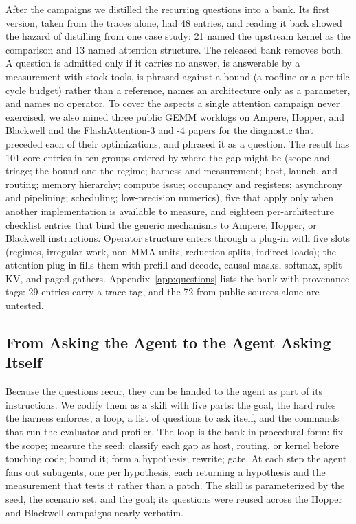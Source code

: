 After the campaigns we distilled the recurring questions into a bank. Its first version, taken from
the traces alone, had 48 entries, and reading it back showed the hazard of distilling from one case
study: 21 named the upstream kernel as the comparison and 13 named attention structure. The released
bank removes both. A question is admitted only if it carries no answer, is answerable by a
measurement with stock tools, is phrased against a bound (a roofline or a per-tile cycle budget)
rather than a reference, names an architecture only as a parameter, and names no operator. To cover
the aspects a single attention campaign never exercised, we also mined three public GEMM worklogs on
Ampere, Hopper, and Blackwell \cite{boehm2022cudammm,shankhdhar2024h100,modular2025blackwell} and
the FlashAttention-3 and -4 papers \cite{shah2024flashattention3,zadouri2026flashattention4} for
the diagnostic that preceded each of their optimizations, and phrased it as a question. The result
has 101 core entries in ten groups ordered by where the gap might be (scope and triage; the bound
and the regime; harness and measurement; host, launch, and routing; memory hierarchy; compute issue;
occupancy and registers; asynchrony and pipelining; scheduling; low-precision numerics), five that
apply only when another implementation is available to measure, and eighteen per-architecture
checklist entries that bind the generic mechanisms to Ampere, Hopper, or Blackwell instructions.
Operator structure enters through a plug-in with five slots (regimes, irregular work, non-MMA
units, reduction splits, indirect loads); the attention plug-in fills them with prefill and decode,
causal masks, softmax, split-KV, and paged gathers. Appendix~\ref{app:questions} lists the bank with
provenance tags: 29 entries carry a trace tag, and the 72 from public sources alone are untested.

\subsection{From Asking the Agent to the Agent Asking Itself}
\label{sec:workflow-skill}

Because the questions recur, they can be handed to the agent as part of its instructions. We codify
them as a skill with five parts: the goal, the hard rules the harness enforces, a loop, a list of
questions to ask itself, and the commands that run the evaluator and profiler. The loop is the bank
in procedural form: fix the scope; measure the seed; classify each gap as host, routing, or kernel
before touching code; bound it; form a hypothesis; rewrite; gate. At each step the agent fans out
subagents, one per hypothesis, each returning a hypothesis and the measurement that tests it rather
than a patch. The skill is parameterized by the seed, the scenario set, and the goal; its questions
were reused across the Hopper and Blackwell campaigns nearly verbatim.


